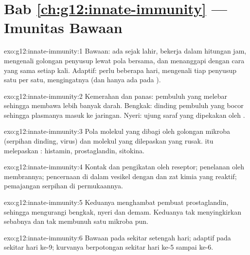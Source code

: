 \section*{Bab \ref{ch:g12:innate-immunity} --- Imunitas Bawaan}

\begin{solution}{exo:g12:innate-immunity:1}
Bawaan: ada sejak lahir, bekerja dalam hitungan jam, mengenali golongan
penyusup lewat pola bersama, dan menanggapi dengan cara yang sama
setiap kali. Adaptif: perlu beberapa hari, mengenali tiap penyusup satu
per satu, mengingatnya (dan hanya ada pada ).
\end{solution}

\begin{solution}{exo:g12:innate-immunity:2}
Kemerahan dan panas: pembuluh yang melebar sehingga membawa lebih
banyak darah. Bengkak: dinding pembuluh yang bocor sehingga plasmanya
masuk ke jaringan. Nyeri: ujung saraf yang dipekakan oleh .
\end{solution}

\begin{solution}{exo:g12:innate-immunity:3}
Pola molekul yang dibagi oleh golongan mikroba (serpihan dinding,  virus) dan molekul yang dilepaskan  yang rusak.  itu
melepaskan : histamin, prostaglandin, sitokina.
\end{solution}

\begin{solution}{exo:g12:innate-immunity:4}
Kontak dan pengikatan oleh reseptor; penelanan oleh membrannya;
pencernaan di dalam vesikel dengan  dan zat kimia yang reaktif;
pemajangan serpihan  di permukaannya.
\end{solution}

\begin{solution}{exo:g12:innate-immunity:5}
Keduanya menghambat  pembuat prostaglandin, sehingga mengurangi
bengkak, nyeri dan demam. Keduanya tak menyingkirkan sebabnya dan tak
membunuh satu mikroba pun.
\end{solution}

\begin{solution}{exo:g12:innate-immunity:6}
Bawaan pada sekitar setengah hari; adaptif pada sekitar hari ke-9;
kurvanya berpotongan sekitar hari ke-5 sampai ke-6.
\end{solution}

